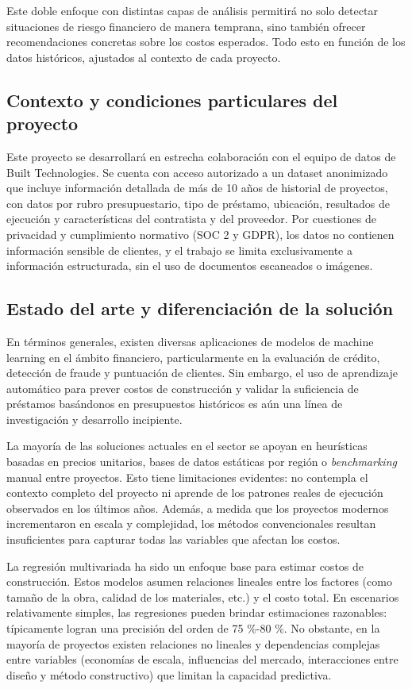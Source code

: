 \documentclass[
11pt, %
]{charter}
\begin{document}
Este doble enfoque con distintas capas de análisis permitirá no solo detectar situaciones de riesgo financiero de manera temprana, sino también ofrecer recomendaciones concretas sobre los costos esperados. Todo esto en función de los datos históricos, ajustados al contexto de cada proyecto.

\subsection*{Contexto y condiciones particulares del proyecto}

Este proyecto se desarrollará en estrecha colaboración con el equipo de datos de Built Technologies. Se cuenta con acceso autorizado a un dataset anonimizado que incluye información detallada de más de 10 años de historial de proyectos, con datos por rubro presupuestario, tipo de préstamo, ubicación, resultados de ejecución y características del contratista y del proveedor. Por cuestiones de privacidad y cumplimiento normativo (SOC 2 y GDPR), los datos no contienen información sensible de clientes, y el trabajo se limita exclusivamente a información estructurada, sin el uso de documentos escaneados o imágenes.

\subsection*{Estado del arte y diferenciación de la solución}

En términos generales, existen diversas aplicaciones de modelos de machine learning en el ámbito financiero, particularmente en la evaluación de crédito, detección de fraude y puntuación de clientes. Sin embargo, el uso de aprendizaje automático para prever costos de construcción y validar la suficiencia de préstamos basándonos en presupuestos históricos es aún una línea de investigación y desarrollo incipiente.

La mayoría de las soluciones actuales en el sector se apoyan en heurísticas basadas en precios unitarios, bases de datos estáticas por región o \textit{benchmarking} manual entre proyectos. Esto tiene limitaciones evidentes: no contempla el contexto completo del proyecto ni aprende de los patrones reales de ejecución observados en los últimos años. Además, a medida que los proyectos modernos incrementaron en escala y complejidad, los métodos convencionales resultan insuficientes para capturar todas las variables que afectan los costos.

La regresión multivariada ha sido un enfoque base para estimar costos de construcción. Estos modelos asumen relaciones lineales entre los factores (como tamaño de la obra, calidad de los materiales, etc.) y el costo total. En escenarios relativamente simples, las regresiones pueden brindar estimaciones razonables: típicamente logran una precisión del orden de 75 \%-80 \%. No obstante, en la mayoría de proyectos existen relaciones no lineales y dependencias complejas entre variables (economías de escala, influencias del mercado, interacciones entre diseño y método constructivo) que limitan la capacidad predictiva.
\end{document}
